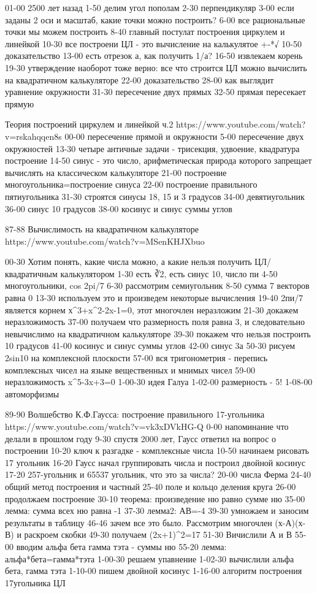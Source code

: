 01-00 2500 лет назад
1-50 делим угол пополам
2-30 перпендикуляр
3-00 если заданы 2 оси и масштаб, какие точки можно построить?
6-00 все рациональные точки мы можем построить
8-40 главный постулат построения циркулем и линейкой
10-30 все построени ЦЛ - это вычисление на калькулятое +-*√
10-50 доказательство
13-00 есть отрезок а, как получить 1/а?
16-50 извлекаем корень
19-30 утверждение наоборот тоже верно: все что строится ЦЛ можно вычислить на квадратичном калькуляторе
22-00 доказательство
28-00 как выглядит уравнение окружности
31-30 пересечение двух прямых
32-50 прямая пересекает прямую

Теория построений циркулем и линейкой ч.2
https://www.youtube.com/watch?v=rskahqqen8s
00-00 пересечение прямой и окружности
5-00 пересечение двух окружностей
13-30 четыре античные задачи - трисекция, удвоение, квадратура построение
14-50 синус - это число, арифметическая природа которого запрещает вычислять на классическом калькуляторе
21-00 построение многоугольника=построение синуса
22-00 построение правильного пятиугольника
31-30 строятся синусы 18, 15 и 3 градусов
34-00 девятиугольник
36-00 синус 10 градусов
38-00 косинус и синус суммы углов

87-88
Вычислимость на квадратичном калькуляторе
https://www.youtube.com/watch?v=MSenKHJXbuo

00-30 Хотим понять, какие числа можно, а какие нельзя получить ЦЛ/квадратичным калькулятором
1-30 есть ∛2, есть синус 10, число пи
4-50 многоугольники, cos 2pi/7
6-30 рассмотрим семиугольник
8-50 сумма 7 векторов равна 0
13-30 используем это и произведем некоторые вычисления
19-40 2пи/7 является корнем х^3+x^2-2x-1=0, этот многочлен неразложим
21-30 докажем неразложимость
37-00 получаем что размерность поля равна 3, и следовательно невычислимо на квадратичном калькуляторе
39-30 покажем что нельзя построить 10 градусов
41-00 косинус и синус суммы углов
42-00 синус 3а
50-30 рисуем 2sin10 на комплексной плоскости
57-00 вся тригонометрия - перепись комплексных чисел на языке вещественных и мнимых чисел
59-00 неразложимость x^5-3x+3=0
1-00-30 идея Галуа
1-02-00 размерность - 5!
1-08-00 автоморфизмы


89-90
Волшебство К.Ф.Гаусса: построение правильного 17-угольника
https://www.youtube.com/watch?v=vk3xDVkHG-Q
0-00 напоминание что делали в прошлом году
9-30 спустя 2000 лет, Гаусс ответил на вопрос о построении
10-20 ключ к разгадке - комплексные числа
10-50 начинаем рисовать 17 угольник
16-20 Гаусс начал группировать числа и построил двойной косинус
17-20 257-угольник и 65537 угольник, что это за числа?
20-00 числа Ферма
24-40 общий метод построения и частный
25-40 поле и кольцо деления круга
26-00 продолжаем построение
30-10 теорема: произведение ню равно сумме ню
35-00 лемма: сумма всех ню равна -1
37-30 лемма2: АВ=-4
39-30 умножаем и заносим результаты в таблицу
46-46 зачем все это было. Рассмотрим многочлен (х-А)(х-В) и раскроем скобки
49-30 получаем (2x+1)^2=17
51-30 Вичислили А и  В
55-00 вводим альфа бета гамма тэта  - суммы ню
55-20 лемма: альфа*бета=гамма*тэта
1-00-30 решаем упавнение
1-02-30 вычислили альфа бета, гамма тэта
1-10-00 пишем двойной косинус
1-16-00 алгоритм построения 17угольника  ЦЛ

